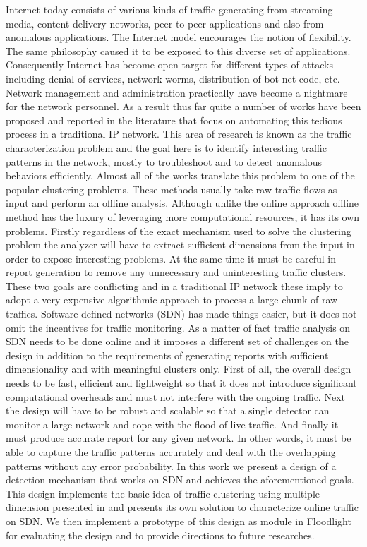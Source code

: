 \documentclass[twocolumn]{article}
\begin{document}
Internet today consists of various kinds of traffic generating from streaming media, content delivery networks, peer-to-peer applications and also from anomalous applications. The Internet model encourages the notion of flexibility. The same philosophy caused it to be exposed to this diverse set of applications. Consequently Internet has become open target for different types of attacks including denial of services, network worms, distribution of bot net code, etc. Network management and administration practically have become a nightmare for the network personnel. As a result thus far quite a number of works have been proposed and reported in the literature that focus on automating this tedious process in a traditional IP network. This area of research is known as the traffic characterization problem and the goal here is to identify interesting traffic patterns in the network, mostly to troubleshoot and to detect anomalous behaviors efficiently.  Almost all of the works translate this problem to one of the popular clustering problems. These methods usually take raw traffic flows as input and perform an offline analysis. Although unlike the online approach offline method has the luxury of leveraging more computational resources, it has its own problems. Firstly regardless of the exact mechanism used to solve the clustering problem the analyzer will have to extract sufficient dimensions from the input in order to expose interesting problems. At the same time it must be careful in report generation to remove any unnecessary and uninteresting traffic clusters. These two goals are conflicting and in a traditional IP network these imply to adopt a very expensive algorithmic approach to process a large chunk of raw traffics. Software defined networks (SDN) has made things easier, but it does not omit the incentives for traffic monitoring. As a matter of fact traffic analysis on SDN needs to be done online and it imposes a different set of challenges on the design in addition to the requirements of generating reports with sufficient dimensionality and with meaningful clusters only. First of all, the overall design needs to be fast, efficient and lightweight so that it does not introduce significant computational overheads and must not interfere with the ongoing traffic. Next the design will have to be robust and scalable so that a single detector can monitor a large network and cope with the flood of live traffic. And finally it must produce accurate report for any given network. In other words, it must be able to capture the traffic patterns accurately and deal with the overlapping patterns without any error probability. In this work we present a design of a detection mechanism that works on SDN and achieves the aforementioned goals. This design implements the basic idea of traffic clustering using multiple dimension presented in \cite{autofocus} and presents its own solution to characterize online traffic on SDN. We then implement a prototype of this design as module in Floodlight   \cite{floodlight} for evaluating the design and to provide directions to future researches. \\\\
\end{document}
